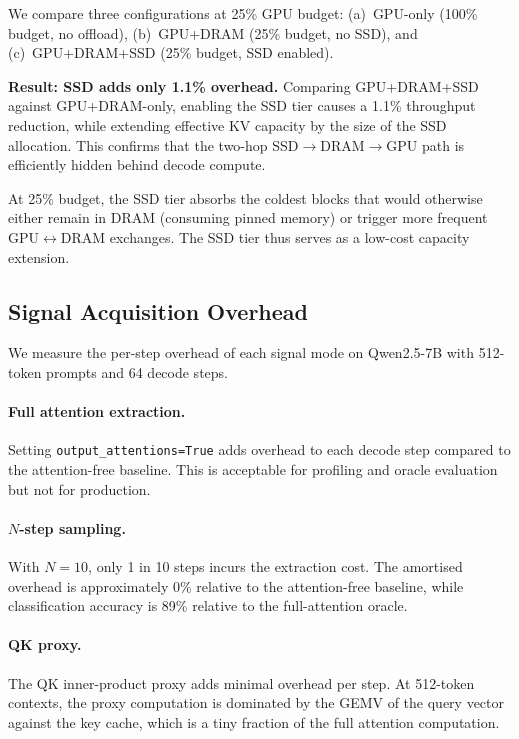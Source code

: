 \documentclass[acmsmall,nonacm,screen]{acmart}
\begin{document}
We compare three configurations at 25\% GPU budget: (a)~GPU-only (100\%
budget, no offload), (b)~GPU+DRAM (25\% budget, no SSD), and
(c)~GPU+DRAM+SSD (25\% budget, SSD enabled).

\textbf{Result: SSD adds only 1.1\% overhead.}  Comparing GPU+DRAM+SSD
against GPU+DRAM-only, enabling the SSD tier causes a 1.1\% throughput
reduction, while extending effective KV capacity by the size of the SSD
allocation.  This confirms that the two-hop SSD$\to$DRAM$\to$GPU path
is efficiently hidden behind decode compute.

At 25\% budget, the SSD tier absorbs the coldest blocks that would otherwise
either remain in DRAM (consuming pinned memory) or trigger more frequent
GPU$\leftrightarrow$DRAM exchanges.  The SSD tier thus serves as a
low-cost capacity extension.

\subsection{Signal Acquisition Overhead}\label{sec:eval:overhead}

We measure the per-step overhead of each signal mode on Qwen2.5-7B with
512-token prompts and 64 decode steps.

\paragraph{Full attention extraction.}
Setting \texttt{output\_attentions=True} adds overhead to each decode step
compared to the attention-free baseline.  This is acceptable for
profiling and oracle evaluation but not for production.

\paragraph{$N$-step sampling.}
With $N{=}10$, only 1 in 10 steps incurs the extraction cost.  The amortised
overhead is approximately 0\% relative to the attention-free baseline, while
classification accuracy is 89\% relative to the full-attention oracle.

\paragraph{QK proxy.}
The QK inner-product proxy adds minimal overhead per step.  At 512-token
contexts, the proxy computation is dominated by the GEMV of the query
vector against the key cache, which is a tiny fraction of the full
attention computation.
\end{document}
